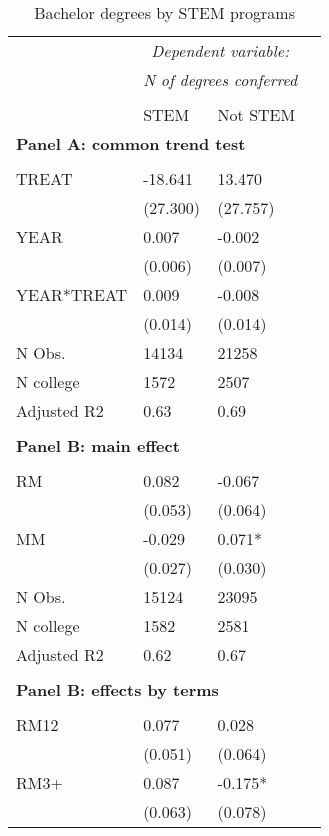 \documentclass[12pt]{article}%
\begin{document}
\FloatBarrier
\begin{table}\centering 
  \begin{threeparttable}
  \caption{Bachelor degrees by STEM programs }
   \label{tab:stem}
\begin{tabular}{lll}
\toprule
 &  \multicolumn{2}{c}{\textit{Dependent variable:}} \\ 
  &  \multicolumn{2}{c}{\textit{N of degrees conferred}} \\ 
\cline{2-3}  \\[-1.8ex] 
& STEM \text{   } & Not STEM \\
\midrule
\multicolumn{4}{l}{\textbf{Panel A: common trend test} }\\  \\[-1.8ex] 
TREAT & -18.641 & 13.470 \\
& (27.300) & (27.757) \\
YEAR & 0.007 & -0.002 \\
& (0.006) & (0.007) \\
YEAR*TREAT & 0.009 & -0.008 \\
& (0.014) & (0.014) \\
\cline{2-3} 
N Obs. & 14134 & 21258 \\
N college & 1572 & 2507 \\
Adjusted R2 & 0.63 & 0.69 \\
\hline \\[-1.8ex] 
\multicolumn{4}{l}{\textbf{Panel B: main effect}}\\  \\[-1.8ex] 
RM & 0.082 & -0.067 \\
& (0.053) & (0.064) \\
MM & -0.029 & 0.071* \\
& (0.027) & (0.030) \\
\cline{2-3} 
N Obs. & 15124 & 23095 \\
N college & 1582 & 2581 \\
Adjusted R2 & 0.62 & 0.67 \\
\hline \\[-1.8ex] 
\multicolumn{4}{l}{\textbf{Panel B: effects by terms}}\\  \\[-1.8ex] 
RM12 & 0.077 & 0.028 \\
& (0.051) & (0.064) \\
RM3+ & 0.087 & -0.175* \\
& (0.063) & (0.078) \\

\end{tabular}
\end{threeparttable}
\end{table}
\end{document}
